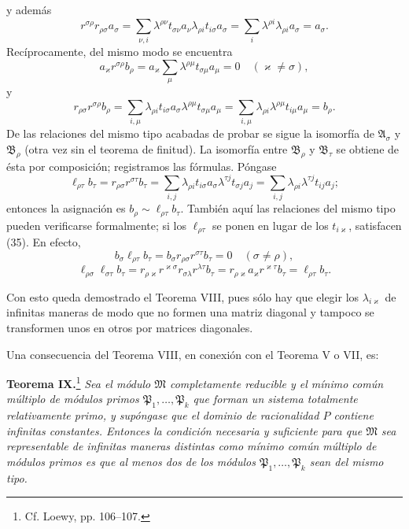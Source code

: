 y además
\[
 r^{\sigma\rho}r_{\rho\sigma}a_\sigma
 =\sum_{\nu,i}\lambda^{\rho\nu}t_{\sigma\nu}a_\nu\lambda_{\rho i}t_{i\sigma}a_\sigma
 =\sum_i\lambda^{\rho i}\lambda_{\rho i}a_\sigma=a_\sigma.
\]
Recíprocamente, del mismo modo se encuentra
\[
 a_\varkappa r^{\sigma\rho}b_\rho
 =a_\varkappa\sum_\mu\lambda^{\rho\mu}t_{\sigma\mu}a_\mu=0
 \quad(\varkappa\ne\sigma),
\]
y
\[
 r_{\rho\sigma}r^{\sigma\rho}b_\rho
 =\sum_{i,\mu}\lambda_{\rho i}t_{i\sigma}a_\sigma\lambda^{\rho\mu}t_{\sigma\mu}a_\mu
 =\sum_{i,\mu}\lambda_{\rho i}\lambda^{\rho\mu}t_{i\mu}a_\mu=b_\rho.
\]
De las relaciones del mismo tipo acabadas de probar se sigue la isomorfía de $\mathfrak A_\sigma$ y $\mathfrak B_\rho$ (otra vez sin el teorema de finitud). La isomorfía entre $\mathfrak B_\rho$ y $\mathfrak B_\tau$ se obtiene de ésta por composición; registramos las fórmulas. Póngase
\[
 \ell_{\rho\tau}b_\tau=r_{\rho\sigma}r^{\sigma\tau}b_\tau
 =\sum_{i,j}\lambda_{\rho i}t_{i\sigma}a_\sigma\lambda^{\tau j}t_{\sigma j}a_j
 =\sum_{i,j}\lambda_{\rho i}\lambda^{\tau j}t_{ij}a_j;
\]
entonces la asignación es $b_\rho\sim\ell_{\rho\tau}b_\tau$. También aquí las relaciones del mismo tipo pueden verificarse formalmente; si los $\ell_{\rho\tau}$ se ponen en lugar de los $t_{i\varkappa}$, satisfacen (35). En efecto,
\[
 b_\sigma\ell_{\rho\tau}b_\tau=b_\sigma r_{\rho\sigma}r^{\sigma\tau}b_\tau=0\quad(\sigma\ne\rho),
\]
\[
 \ell_{\rho\sigma}\ell_{\sigma\tau}b_\tau=r_{\rho\varkappa}r^{\varkappa\sigma}r_{\sigma\lambda}r^{\lambda\tau}b_\tau
 =r_{\rho\varkappa}a_\varkappa r^{\varkappa\tau}b_\tau=\ell_{\rho\tau}b_\tau.
\]

Con esto queda demostrado el Teorema VIII, pues sólo hay que elegir los $\lambda_{i\varkappa}$ de infinitas maneras de modo que no formen una matriz diagonal y tampoco se transformen unos en otros por matrices diagonales.

Una consecuencia del Teorema VIII, en conexión con el Teorema V o VII, es:

\textbf{Teorema IX.}\footnote{Cf. Loewy, pp. 106--107.} \emph{Sea el módulo $\mathfrak M$ completamente reducible y el mínimo común múltiplo de módulos primos $\mathfrak P_1,\ldots,\mathfrak P_k$ que forman un sistema totalmente relativamente primo, y supóngase que el dominio de racionalidad $P$ contiene infinitas constantes. Entonces la condición necesaria y suficiente para que $\mathfrak M$ sea representable de infinitas maneras distintas como mínimo común múltiplo de módulos primos es que al menos dos de los módulos $\mathfrak P_1,\ldots,\mathfrak P_k$ sean del mismo tipo.}

